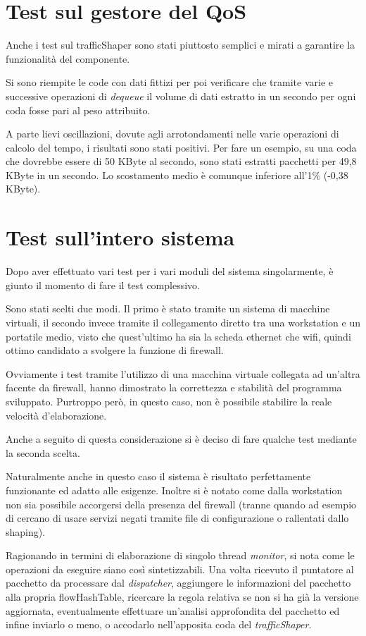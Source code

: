 \section{Test sul gestore del QoS}

Anche i test sul trafficShaper sono stati piuttosto semplici e mirati a garantire la funzionalità del componente.

Si sono riempite le code con dati fittizi per poi verificare che tramite varie e successive operazioni di \emph{dequeue} il volume di dati estratto in un secondo per ogni coda fosse pari al peso attribuito.

A parte lievi oscillazioni, dovute agli arrotondamenti nelle varie operazioni di calcolo del tempo, i risultati sono stati positivi. Per fare un esempio, su una coda che dovrebbe essere di 50 KByte al secondo, sono stati estratti pacchetti per 49,8 KByte in un secondo. Lo scostamento medio è comunque inferiore all'1\% (-0,38 KByte).

\clearpage
\section{Test sull'intero sistema}

Dopo aver effettuato vari test per i vari moduli del sistema singolarmente, è giunto il momento di fare il test complessivo.

Sono stati scelti due modi. Il primo è stato tramite un sistema di macchine virtuali, il secondo invece tramite il collegamento diretto tra una workstation e un portatile medio, visto che quest'ultimo ha sia la scheda ethernet che wifi, quindi ottimo candidato a svolgere la funzione di firewall.

Ovviamente i test tramite l'utilizzo di una macchina virtuale collegata ad un'altra facente da firewall, hanno dimostrato la correttezza e stabilità del programma sviluppato. Purtroppo però, in questo caso, non è possibile stabilire la reale velocità d'elaborazione.

Anche a seguito di questa considerazione si è deciso di fare qualche test mediante la seconda scelta.

Naturalmente anche in questo caso il sistema è risultato perfettamente funzionante ed adatto alle esigenze. Inoltre si è notato come dalla workstation non sia possibile accorgersi della presenza del firewall (tranne quando ad esempio di cercano di usare servizi negati tramite file di configurazione o rallentati dallo shaping).

Ragionando in termini di elaborazione di singolo thread \emph{monitor}, si nota come le operazioni da eseguire siano così sintetizzabili. Una volta ricevuto il puntatore al pacchetto da processare dal \emph{dispatcher}, aggiungere le informazioni del pacchetto alla propria flowHashTable, ricercare la regola relativa se non si ha già la versione aggiornata, eventualmente effettuare un'analisi approfondita del pacchetto ed infine inviarlo o meno, o accodarlo nell'apposita coda del \emph{trafficShaper}.

